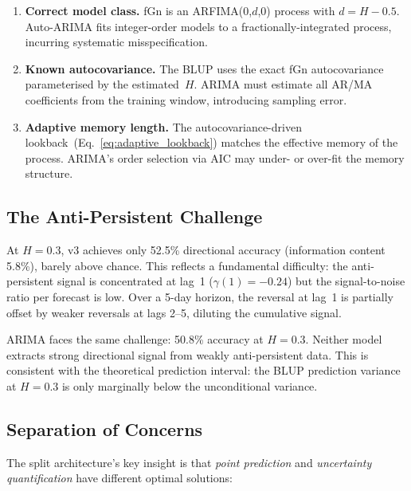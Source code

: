 \documentclass[12pt,a4paper]{article}
\begin{document}
\begin{enumerate}
  \item \textbf{Correct model class.}  fGn is an ARFIMA(0,$d$,0) process
        with $d = H - 0.5$.  Auto-ARIMA fits integer-order models to a
        fractionally-integrated process, incurring systematic
        misspecification.
  \item \textbf{Known autocovariance.}  The BLUP uses the exact fGn
        autocovariance parameterised by the estimated~$H$.  ARIMA must
        estimate all AR/MA coefficients from the training window,
        introducing sampling error.
  \item \textbf{Adaptive memory length.}  The autocovariance-driven
        lookback~(Eq.~\ref{eq:adaptive_lookback}) matches the effective
        memory of the process.  ARIMA's order selection via AIC may under-
        or over-fit the memory structure.
\end{enumerate}

\subsection{The Anti-Persistent Challenge}

At $H = 0.3$, v3 achieves only 52.5\% directional accuracy (information
content 5.8\%), barely above chance.  This reflects a fundamental
difficulty: the anti-persistent signal is concentrated at lag~1
($\gamma(1) = -0.24$) but the signal-to-noise ratio per forecast is low.
Over a 5-day horizon, the reversal at lag~1 is partially offset by weaker
reversals at lags 2--5, diluting the cumulative signal.

ARIMA faces the same challenge: 50.8\% accuracy at $H = 0.3$.  Neither
model extracts strong directional signal from weakly anti-persistent data.
This is consistent with the theoretical prediction interval: the BLUP
prediction variance at $H = 0.3$ is only marginally below the unconditional
variance.

\subsection{Separation of Concerns}

The split architecture's key insight is that \emph{point prediction} and
\emph{uncertainty quantification} have different optimal solutions:
\end{document}
